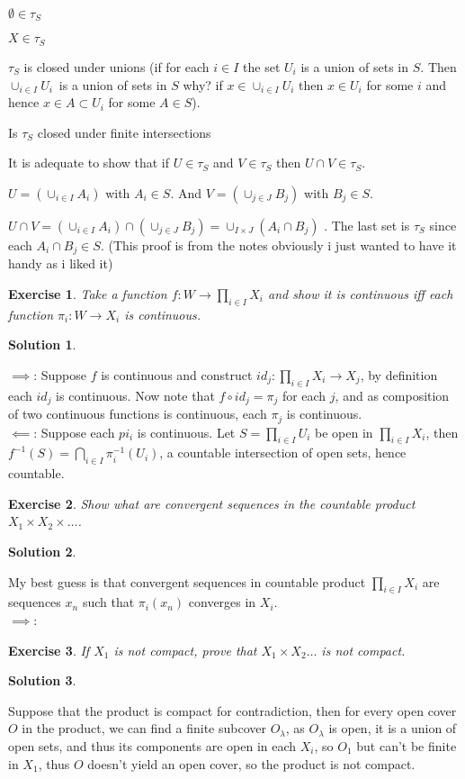 \documentclass[11pt,a4paper]{article}
\newtheorem{Ex}{Exercise}
\newtheorem{Sol}{Solution}
\begin{document}
$\emptyset \in \tau _{S}$

$X\in \tau _{S}$

$\tau _{S}$ is closed under unions (if for each $i\in I$ the set $U_{i}$ is
a union of sets in $S.$ Then $\cup _{i\in I}U_{i}$\ is a union of sets in $S$
why? if $x\in \cup _{i\in I}U_{i}$ then $x\in U_{i}$ for some $i$ and hence $%
x\in A\subset U_{i}$ for some $A\in S$).

Is $\tau _{S}$ closed under finite intersections

It is adequate to show that if $U\in \tau _{S}$ and $V\in \tau _{S}$ then $%
U\cap V\in \tau _{S}.$

$U=(\cup _{i\in I}A_{i})$ with $A_{i}\in S.$ And $V=(\cup _{j\in J}B_{j})$
with $B_{j}\in S.$

$U\cap V=(\cup _{i\in I}A_{i})\cap (\cup _{j\in J}B_{j})=\cup _{I\times
	J}(A_{i}\cap B_{j})$ . The last set is $\tau _{S}$ since each $A_{i}\cap
B_{j}\in S.$ (This proof is from the notes obviously i just wanted to have it handy as i liked it)
\begin{Ex}
	Take a function $f: W \rightarrow \prod_{i \in I}X_i$ and show it is continuous iff each function $\pi_i : W \rightarrow X_i$ is continuous.  
\end{Ex}   

\begin{Sol}\end{Sol}
\noindent $\implies$: Suppose $f$ is continuous and construct $id_j : \prod_{i \in I}X_i \rightarrow X_j$, by definition each $id_j$ is continuous. Now note that $f \circ id_j = \pi_j$ for each $j$, and as composition of two continuous functions is continuous, each $\pi_j$ is continuous.  \\
\noindent$\impliedby$: Suppose each $pi_i$ is continuous. Let $S= \prod_{i \in I}U_i$ be open in $\prod_{i \in I}X_i$, then $f^{-1}(S) = \bigcap_{i \in I}\pi_i^{-1}(U_i)$, a countable intersection of open sets, hence countable.

\begin{Ex}
	Show what are convergent sequences in the countable product $X_1 \times X_2 \times \dots$.
\end{Ex}
\begin{Sol}\end{Sol}
\noindent My best guess is that convergent sequences in countable product $\prod_{i \in I}X_i$ are sequences $x_n$ such that $\pi_i(x_n)$ converges in $X_i$. \\ 
$\implies$:  

\begin{Ex}
	If $X_1$ is not compact, prove that $X_1 \times X_2 \dots$ is not compact.
\end{Ex}
\begin{Sol}\end{Sol}
\noindent Suppose that the product is compact for contradiction, then for every open cover $O$ in the product, we can find a finite subcover $O_\lambda$, as $O_\lambda$ is open, it is a union of open sets, and thus its components are open in each $X_i$, so $O_1$ but  can't be finite in $X_1$, thus $O$ doesn't yield an open cover, so the product is not compact.
\end{document}
